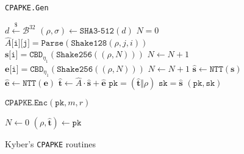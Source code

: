 \documentclass[floatrow,journal=tches,submission]{iacrtrans}
\newcommand{\monospace}{\texttt}
\newcommand{\pk}{\monospace{pk}}
\newcommand{\sk}{\monospace{sk}}
\newcommand{\leftsample}{\stackrel{\$}{\leftarrow}}
\begin{document}
\begin{figure}[H]
    \begin{algorithm}[H]
        \caption{\monospace{CPAPKE.Gen}}\label{alg:kyber-cpapke-keygen}
        \begin{algorithmic}[1]
            \State $d \leftsample \mathcal{B}^{32}$
            \State $(\rho, \sigma) \leftarrow \monospace{SHA3-512}(d)$
            \State $N = 0$
                    \State $\hat{A}\monospace{[i][j]} = \monospace{Parse}(
                        \monospace{Shake128}(\rho, j, i)
                    )$
                \EndFor
            \EndFor
                \State $\mathbf{s}\monospace{[i]} = \monospace{CBD}_{\eta_1}(
                    \monospace{Shake256}((\rho, N))
                )$
                \State $N \leftarrow N + 1$
            \EndFor
                \State $\mathbf{e}\monospace{[i]} = \monospace{CBD}_{\eta_1}(
                    \monospace{Shake256}((\rho, N))
                )$
                \State $N \leftarrow N + 1$
            \EndFor
            \State $\mathbf{\hat{s}} \leftarrow \monospace{NTT}(\mathbf{s})$
            \State $\mathbf{\hat{e}} \leftarrow \monospace{NTT}(\mathbf{e})$
            \State $\mathbf{\hat{t}} \leftarrow \hat{A} \cdot \mathbf{\hat{s}} + \mathbf{\hat{e}}$
            \State $\pk = (\mathbf{\hat{t}} \Vert \rho)$
            \State $\sk = \mathbf{\hat{s}}$
            \State \Return $(\pk, \sk)$
        \end{algorithmic}
    \end{algorithm}
    \begin{algorithm}[H]
        \caption{$\monospace{CPAPKE.Enc}(\pk, m, r)$}\label{alg:kyber-cpapke-encrypt}
        \begin{algorithmic}[1]
            \State $N \leftarrow 0$
            \State $(\rho, \mathbf{\hat{t}}) \leftarrow \pk$
            \For{}
                \For{}
                \EndFor{}
            \EndFor{}
        \end{algorithmic}
    \end{algorithm}
    \caption{Kyber's \monospace{CPAPKE} routines}\label{fig:kyber-cpapke-routines}
\end{figure}
\end{document}
